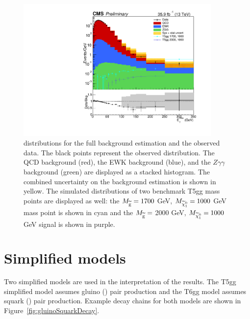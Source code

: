 \begin{figure}[h]
\begin{center}
\includegraphics[width=0.9\textwidth]{Figures/Results/finalPlot.pdf}
\end{center}
\caption[\ETmiss distributions for the full background estimation and the observed data.]
{\ETmiss distributions for the full background estimation and the observed data. 
	The black points represent the observed \ETmiss distribution. 
	The QCD background (red), the EWK background
	(blue), and the $Z\gamma\gamma$ background (green) are displayed as a stacked histogram. 
	The combined uncertainty on the background estimation is shown in yellow.
	The simulated \ETmiss distributions of two benchmark T5gg mass points are displayed as well:
	the $M_{\widetilde{\mathrm{g}}} = 1700$ GeV, $M_{\widetilde{\chi}^{0}_{1}} = 1000$ GeV mass point is shown in cyan and the
	 $M_{\widetilde{\mathrm{g}} }=$ 2000 GeV, $M_{\widetilde{\chi}^{0}_{1}} = 1000$ GeV signal is shown in purple.}
\label{fig:FinalPlot}
\end{figure}


\section{Simplified models}
\label{sec:SimplifiedModels}

Two simplified models are used in the interpretation of the results. The T5gg simplified model assumes gluino (\gluino) pair production and the T6gg model assumes squark (\squark) pair production. Example decay chains for both models are shown in Figure~\ref{fig:gluinoSquarkDecay}.

